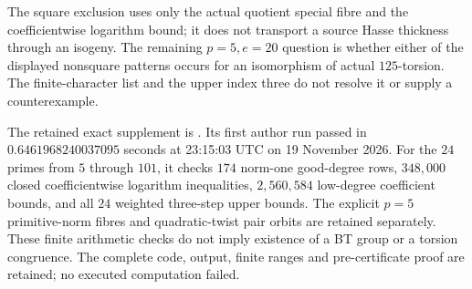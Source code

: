 \begin{remark}
\label{rem:B-RD77-scope}
The square exclusion uses only the actual quotient special fibre
and the coefficientwise logarithm bound; it does not transport a
source Hasse thickness through an isogeny. The remaining
\(p=5,e=20\) question is whether either of the displayed
nonsquare patterns occurs for an isomorphism of actual
\(125\)-torsion. The finite-character list and the upper index
three do not resolve it or supply a counterexample.

The retained exact supplement is
.
Its first author run passed in \(0.6461968240037095\) seconds
at 23:15:03 UTC on 19 November 2026. For the \(24\) primes
from \(5\) through \(101\), it checks \(174\) norm-one
good-degree rows, \(348{,}000\) closed coefficientwise logarithm
inequalities, \(2{,}560{,}584\) low-degree coefficient bounds,
and all \(24\) weighted three-step upper bounds. The explicit
\(p=5\) primitive-norm fibres and quadratic-twist pair orbits
are retained separately. These finite arithmetic checks do
not imply existence of a BT group or a torsion congruence.
The complete code, output, finite ranges and pre-certificate
proof are retained; no executed computation failed.
\end{remark}
